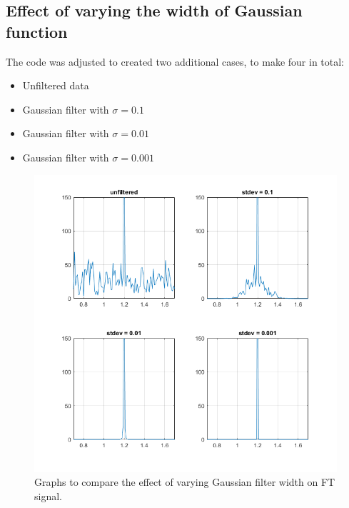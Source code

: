 \documentclass[11pt]{article}
\numberwithin{equation}{section}
\begin{document}
\subsection{Effect of varying the width of Gaussian function}
The code was adjusted to created two additional cases, to make four in total:
\begin{itemize}
    \item Unfiltered data
    \item Gaussian filter with $\sigma = 0.1$
    \item Gaussian filter with $\sigma = 0.01$
    \item Gaussian filter with $\sigma = 0.001$
\end{itemize}

\begin{figure}[H]
    \centering
    \includegraphics[width = \textwidth]{./img/q306a.png}
    \caption{Graphs to compare the effect of varying Gaussian filter width on FT signal.}
    \label{fig:q306a}
\end{figure}
\end{document}
